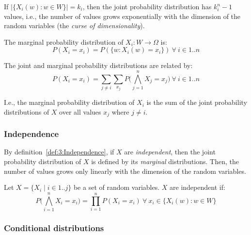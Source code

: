 If $|\{ X_i(w) : w \in W \}| = k_i$, then the joint probability distribution
has $k_i^n - 1$ values, i.e., the number of values grows exponentially with the
dimension of the random variables (the \textit{curse of dimensionality}).

\begin{dfn}
  The marginal probability distribution of $X_i : W \to \Omega$ is:
  \begin{equation}
    P(X_i = x_i) = P(\{ w : X_i(w) = x_i \})
    \ \forall\
    i \in 1 .. n
  \end{equation}
\end{dfn}

\begin{thm}
  The joint and marginal probability distributions are related by:
  \begin{equation}
    P(X_i = x_i) =
    \sum_{j \neq i}
    \sum_{x_j}
    P \bigl( \bigwedge_{j = 1}^{n} X_j = x_j \bigr)
    \ \forall\ i \in 1 .. n
  \end{equation}
\end{thm}

I.e., the marginal probability distribution of $X_i$ is the sum of the joint
probability distributions of $X$ over all values $x_j$ where $j \neq i$.

\subsubsection{Independence}

By definition~\ref{def:3:Independence}, if $X$ are \textit{independent}, then
the joint probability distribution of $X$ is defined by its \textit{marginal}
distributions.
Then, the number of values grows only linearly with the dimension of the random
variables.

\begin{dfn}
  [Independence]
  \label{def:3:Independence}
  Let $X = \{ X_i \mid i \in 1 .. j \}$ be a set of random variables.
  $X$ are independent if:
  \begin{equation}
    P \bigl( \bigwedge_{i = 1}^{n} X_i = x_i \bigr)
    = \prod_{i = 1}^{n} P(X_i = x_i)
    \ \forall \
    x_i \in \{ X_i(w) : w \in W \}
  \end{equation}
\end{dfn}

\subsubsection{Conditional distributions}

